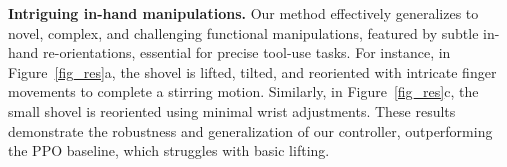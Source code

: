 


\noindent\textbf{Intriguing in-hand manipulations.}
Our method effectively generalizes to novel, complex, and challenging functional manipulations, featured by subtle in-hand re-orientations, essential for precise tool-use tasks. For instance, in Figure~\ref{fig_res}a, the shovel is lifted, tilted, and reoriented with intricate finger movements to complete a {stirring} motion. Similarly, in Figure~\ref{fig_res}c, the small shovel is reoriented using minimal wrist adjustments. These results demonstrate the robustness and generalization of our controller, outperforming the PPO baseline, which struggles with basic lifting. 
